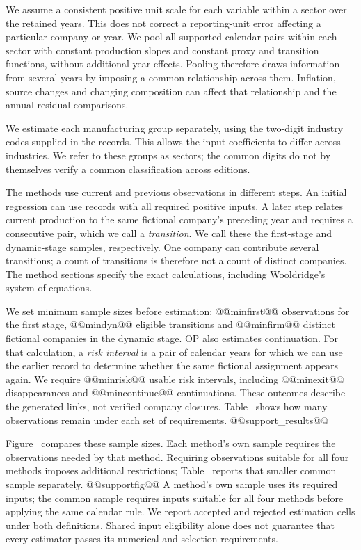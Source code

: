 We assume a consistent positive unit scale for each variable within a sector over the retained years. This does not correct a reporting-unit error affecting a particular company or year. We pool all supported calendar pairs within each sector with constant production slopes and constant proxy and transition functions, without additional year effects. Pooling therefore draws information from several years by imposing a common relationship across them. Inflation, source changes and changing composition can affect that relationship and the annual residual comparisons.

We estimate each manufacturing group separately, using the two-digit industry codes supplied in the records. This allows the input coefficients to differ across industries. We refer to these groups as sectors; the common digits do not by themselves verify a common classification across editions.

The methods use current and previous observations in different steps. An initial regression can use records with all required positive inputs. A later step relates current production to the same fictional company's preceding year and requires a consecutive pair, which we call a \emph{transition}. We call these the first-stage and dynamic-stage samples, respectively. One company can contribute several transitions; a count of transitions is therefore not a count of distinct companies. The method sections specify the exact calculations, including Wooldridge's system of equations.

We set minimum sample sizes before estimation: @@minfirst@@ observations for the first stage, @@mindyn@@ eligible transitions and @@minfirm@@ distinct fictional companies in the dynamic stage. OP also estimates continuation. For that calculation, a \emph{risk interval} is a pair of calendar years for which we can use the earlier record to determine whether the same fictional assignment appears again. We require @@minrisk@@ usable risk intervals, including @@minexit@@ disappearances and @@mincontinue@@ continuations. These outcomes describe the generated links, not verified company closures. Table~ shows how many observations remain under each set of requirements.
@@support_results@@

Figure~ compares these sample sizes. Each method's own sample requires the observations needed by that method. Requiring observations suitable for all four methods imposes additional restrictions; Table~ reports that smaller common sample separately.
@@supportfig@@
A method's own sample uses its required inputs; the common sample requires inputs suitable for all four methods before applying the same calendar rule. We report accepted and rejected estimation cells under both definitions. Shared input eligibility alone does not guarantee that every estimator passes its numerical and selection requirements.

